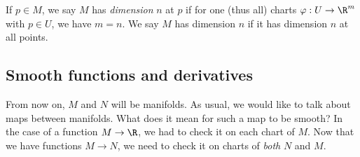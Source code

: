 \documentclass[a4paper]{article}
\begin{document}
\begin{defi}[Dimension]
  If $p \in M$, we say $M$ has \emph{dimension} $n$ at $p$ if for one (thus all) charts $\varphi: U \to \R^m$ with $p \in U$, we have $m = n$. We say $M$ has dimension $n$ if it has dimension $n$ at all points.
\end{defi}

\subsection{Smooth functions and derivatives}
From now on, $M$ and $N$ will be manifolds. As usual, we would like to talk about maps between manifolds. What does it mean for such a map to be smooth? In the case of a function $M \to \R$, we had to check it on each chart of $M$. Now that we have functions $M \to N$, we need to check it on charts of \emph{both} $N$ and $M$.
\end{document}
